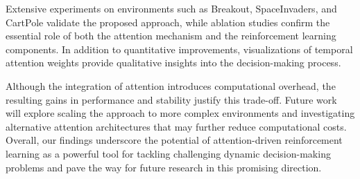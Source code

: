 \documentclass{article}
\begin{document}
Extensive experiments on environments such as Breakout, SpaceInvaders, and CartPole validate the proposed approach, while ablation studies confirm the essential role of both the attention mechanism and the reinforcement learning components. In addition to quantitative improvements, visualizations of temporal attention weights provide qualitative insights into the decision-making process.

Although the integration of attention introduces computational overhead, the resulting gains in performance and stability justify this trade-off. Future work will explore scaling the approach to more complex environments and investigating alternative attention architectures that may further reduce computational costs. Overall, our findings underscore the potential of attention-driven reinforcement learning as a powerful tool for tackling challenging dynamic decision-making problems and pave the way for future research in this promising direction.




\end{document}
